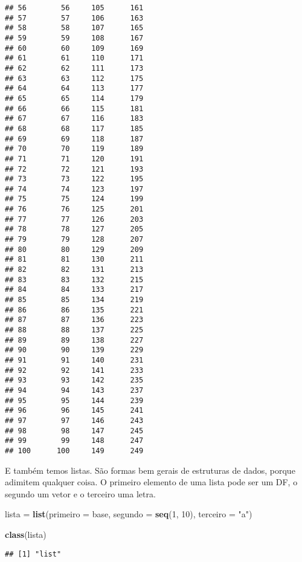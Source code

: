 \documentclass[]{article}
\newenvironment{Shaded}{\begin{snugshade}}{\end{snugshade}}
\newcommand{\DataTypeTok}[1]{\textcolor[rgb]{0.13,0.29,0.53}{#1}}
\newcommand{\DecValTok}[1]{\textcolor[rgb]{0.00,0.00,0.81}{#1}}
\newcommand{\KeywordTok}[1]{\textcolor[rgb]{0.13,0.29,0.53}{\textbf{#1}}}
\newcommand{\NormalTok}[1]{#1}
\newcommand{\StringTok}[1]{\textcolor[rgb]{0.31,0.60,0.02}{#1}}
\begin{document}
\begin{verbatim}
## 56        56     105      161
## 57        57     106      163
## 58        58     107      165
## 59        59     108      167
## 60        60     109      169
## 61        61     110      171
## 62        62     111      173
## 63        63     112      175
## 64        64     113      177
## 65        65     114      179
## 66        66     115      181
## 67        67     116      183
## 68        68     117      185
## 69        69     118      187
## 70        70     119      189
## 71        71     120      191
## 72        72     121      193
## 73        73     122      195
## 74        74     123      197
## 75        75     124      199
## 76        76     125      201
## 77        77     126      203
## 78        78     127      205
## 79        79     128      207
## 80        80     129      209
## 81        81     130      211
## 82        82     131      213
## 83        83     132      215
## 84        84     133      217
## 85        85     134      219
## 86        86     135      221
## 87        87     136      223
## 88        88     137      225
## 89        89     138      227
## 90        90     139      229
## 91        91     140      231
## 92        92     141      233
## 93        93     142      235
## 94        94     143      237
## 95        95     144      239
## 96        96     145      241
## 97        97     146      243
## 98        98     147      245
## 99        99     148      247
## 100      100     149      249
\end{verbatim}

E também temos listas. São formas bem gerais de estruturas de dados,
porque adimitem qualquer coisa. O primeiro elemento de uma lista pode
ser um DF, o segundo um vetor e o terceiro uma letra.

\begin{Shaded}
\begin{Highlighting}[]
\NormalTok{lista =}\StringTok{ }\KeywordTok{list}\NormalTok{(}\DataTypeTok{primeiro =}\NormalTok{ base,}
             \DataTypeTok{segundo =} \KeywordTok{seq}\NormalTok{(}\DecValTok{1}\NormalTok{, }\DecValTok{10}\NormalTok{),}
             \DataTypeTok{terceiro =} \StringTok{"a"}\NormalTok{)}

\KeywordTok{class}\NormalTok{(lista)}
\end{Highlighting}
\end{Shaded}

\begin{verbatim}
## [1] "list"
\end{verbatim}
\end{document}

